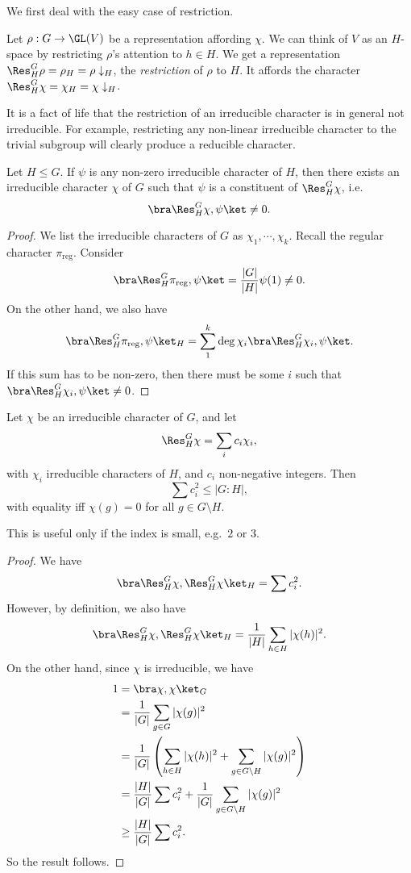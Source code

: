 \documentclass[a4paper]{article}
\begin{document}
We first deal with the easy case of restriction.
\begin{defi}[Restriction]
  Let $\rho: G \to \GL(V)$ be a representation affording $\chi$. We can think of $V$ as an $H$-space by restricting $\rho$'s attention to $h \in H$. We get a representation $\Res^G_H \rho = \rho_H = \rho\downarrow_H$, the \emph{restriction} of $\rho$ to $H$. It affords the character $\Res^G_H \chi = \chi_H = \chi\downarrow_H$.
\end{defi}
It is a fact of life that the restriction of an irreducible character is in general not irreducible. For example, restricting any non-linear irreducible character to the trivial subgroup will clearly produce a reducible character.

\begin{lemma}
  Let $H \leq G$. If $\psi$ is any non-zero irreducible character of $H$, then there exists an irreducible character $\chi$ of $G$ such that $\psi$ is a constituent of $\Res_H^G \chi$, i.e.
  \[
    \bra \Res^G_H \chi, \psi \ket \not= 0.
  \]
\end{lemma}

\begin{proof}
  We list the irreducible characters of $G$ as $\chi_1, \cdots, \chi_k$. Recall the regular character $\pi_{\mathrm{reg}}$. Consider
  \[
    \bra \Res^G_H\pi_{\mathrm{reg}}, \psi\ket = \frac{|G|}{|H|} \psi(1) \not= 0.
  \]
  On the other hand, we also have
  \[
    \bra \Res^G_H\pi_{\mathrm{reg}}, \psi\ket_H = \sum_{1}^k \deg \chi_i \bra \Res^G_H \chi_i, \psi\ket.
  \]
  If this sum has to be non-zero, then there must be some $i$ such that $\bra \Res^G_H \chi_i, \psi\ket \not= 0$.
\end{proof}

\begin{lemma}
  Let $\chi$ be an irreducible character of $G$, and let
  \[
    \Res^G_H \chi = \sum_i c_i \chi_i,
  \]
  with $\chi_i$ irreducible characters of $H$, and $c_i$ non-negative integers. Then
  \[
    \sum c_i^2 \leq |G:H|,
  \]
  with equality iff $\chi(g) = 0$ for all $g \in G\setminus H$.
\end{lemma}
This is useful only if the index is small, e.g.\ $2$ or $3$.
\begin{proof}
  We have
  \[
    \bra \Res^G_H \chi, \Res^G_H \chi\ket_H = \sum c_i^2.
  \]
  However, by definition, we also have
  \[
    \bra \Res^G_H \chi, \Res^G_H \chi\ket_H = \frac{1}{|H|}\sum_{h \in H} |\chi(h)|^2.
  \]
  On the other hand, since $\chi$ is irreducible, we have
  \begin{align*}
    1 &= \bra \chi, \chi\ket_G\\
    &= \frac{1}{|G|}\sum_{g \in G} |\chi(g)|^2 \\
    &= \frac{1}{|G|} \left(\sum_{h \in H} |\chi(h)|^2 + \sum_{g \in G\setminus H} |\chi(g)|^2\right)\\
    &= \frac{|H|}{|G|} \sum c_i^2 + \frac{1}{|G|} \sum_{g \in G \setminus H} |\chi(g)|^2\\
    &\geq \frac{|H|}{|G|} \sum c_i^2.
  \end{align*}
  So the result follows.
\end{proof}
\end{document}
